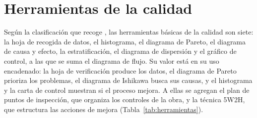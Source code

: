 \section{Herramientas de la calidad}
\label{sec:herramientas}

Según la clasificación que recoge \textcite[p.~26]{zurita2024}, las herramientas básicas de la calidad son siete: la hoja de recogida de datos, el histograma, el diagrama de Pareto, el diagrama de causa y efecto, la estratificación, el diagrama de dispersión y el gráfico de control, a las que se suma el diagrama de flujo. Su valor está en su uso encadenado: la hoja de verificación produce los datos, el diagrama de Pareto prioriza los problemas, el diagrama de Ishikawa busca sus causas, y el histograma y la carta de control muestran si el proceso mejora. A ellas se agregan el plan de puntos de inspección, que organiza los controles de la obra, y la técnica 5W2H, que estructura las acciones de mejora (Tabla~\ref{tab:herramientas}).

